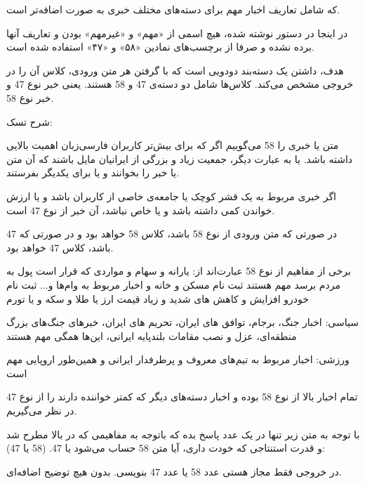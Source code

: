 \vspace{5pt}

که شامل تعاریف اخبار مهم برای دسته‌های مختلف خبری به صورت اضافه‌تر است.

در اینجا در دستور نوشته شده، هیچ اسمی از «مهم» و «غیرمهم» بودن و تعاریف آنها برده نشده و صرفا از برچسب‌های نمادین «۵۸» و «۴۷» استفاده شده است.

\vspace{5pt}
\begin{scriptsize}
\begin{itshape}
    هدف، داشتن یک دسته‌بند دودویی است که با گرفتن هر متن ورودی، کلاس آن را در خروجی مشخص می‌کند. کلاس‌ها شامل دو دسته‌ی 47 و 58 هستند. یعنی خبر نوع 47 و خبر نوع 58.

    شرح تسک:
    
    متن یا خبری را 58 می‌گوییم اگر که برای بیش‌تر کاربران فارسی‌زبان اهمیت بالایی داشته باشد. یا به عبارت دیگر، جمعیت زیاد و بزرگی از ایرانیان مایل باشند که آن متن یا خبر را بخوانند و یا برای یکدیگر بفرستند.
    
     اگر خبری مربوط به یک قشر کوچک یا جامعه‌ی خاصی از کاربران باشد و یا ارزش خواندن کمی داشته باشد و یا خاص نباشد، آن خبر از نوع 47 است.
    
    در صورتی که متن ورودی از نوع 58 باشد، کلاس 58 خواهد بود و در صورتی که 47 باشد، کلاس 47 خواهد بود.
    
    برخی از مفاهیم از نوع 58 عبارت‌اند از:
    یارانه و سهام و مواردی که قرار است پول به مردم برسد مهم هستند
    ثبت نام مسکن و خانه و اخبار مربوط به وام‌ها و...
    ثبت نام خودرو
    افزایش و کاهش های شدید و زیاد قیمت ارز یا طلا و سکه و یا تورم
    
    سیاسی:
    اخبار جنگ، برجام، توافق های ایران،
    تحریم های ایران،
    خبرهای جنگ‌های بزرگ منطقه‌ای،
    عزل و نصب مقامات بلندپایه ایرانی،
    این‌ها همگی مهم هستند
    
    ورزشی:
    اخبار مربوط به تیم‌های معروف و پرطرفدار ایرانی و همین‌طور اروپایی مهم است
    
    تمام اخبار بالا از نوع 58 بوده و اخبار دسته‌های دیگر که کمتر خواننده دارند را از نوع 47 در نظر می‌گیریم.
    
    با توجه به متن زیر تنها در یک عدد پاسخ بده که باتوجه به مفاهیمی که در بالا مطرح شد و قدرت استنتاجی که خودت داری، آیا متن 58 حساب می‌شود یا 47. (58 یا 47):
    
    در خروجی فقط مجاز هستی عدد 58 یا عدد 47 بنویسی. بدون هیچ توضیح اضافه‌ای.
\end{itshape}
\end{scriptsize}
\vspace{5pt}

